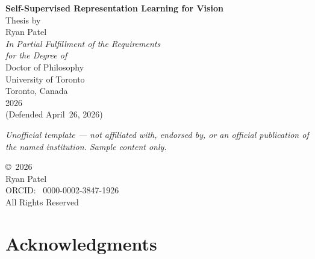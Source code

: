 \documentclass[11pt,twoside,openright]{book}
\begin{document}
\begin{titlepage}
\thispagestyle{empty}
\begin{center}

\vspace*{0.15\textheight}

{\Huge\bfseries Self-Supervised Representation Learning for Vision}\\[36pt]

{\LARGE Thesis by}\\[18pt]

{\LARGE Ryan Patel}\\[48pt]

{\large\textit{In Partial Fulfillment of the Requirements\\[4pt]
for the Degree of}}\\[18pt]

{\LARGE Doctor of Philosophy}\\[48pt]

{\large University of Toronto}\\[6pt]
{\large Toronto, Canada}\\[30pt]

{\large 2026}\\[18pt]

{\normalsize\color{MidGray}(Defended April~26, 2026)}

\vfill
{\footnotesize\itshape Unofficial template --- not affiliated with, endorsed by, or an official publication of the named institution. Sample content only.}
\end{center}
\end{titlepage}

\cleardoublepage
\thispagestyle{empty}
\vspace*{0.4\textheight}

\begin{center}
{\large\copyright\ 2026}\\[12pt]
{\large Ryan Patel}\\[12pt]
{\normalsize ORCID: \faOrcid\ 0000-0002-3847-1926}\\[24pt]
{\normalsize All Rights Reserved}
\end{center}

\cleardoublepage
\chapter*{Acknowledgments}
\end{document}
